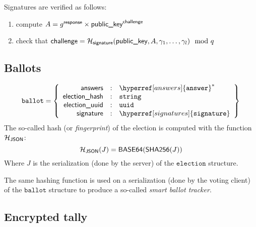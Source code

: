 \documentclass[a4paper]{article}
\newcommand{\basesixfour}{\textsf{BASE64}}
\newcommand{\shatwo}{\textsf{SHA256}}
\newcommand{\jstring}{\texttt{string}}
\newcommand{\uuid}{\texttt{uuid}}
\newcommand{\election}{\texttt{election}}
\newcommand{\ballot}{\texttt{ballot}}
\begin{document}
Signatures are verified as follows:
\begin{enumerate}
\item compute $A=g^{\textsf{response}}\times \textsf{public\_key}^{\textsf{challenge}}$
\item check that $\textsf{challenge}=\mathcal{H}_{\textsf{signature}}(\textsf{public\_key},A,\gamma_1,\dots,\gamma_l)\mod q$
\end{enumerate}

\subsection{Ballots}
\label{ballots}

\newcommand{\json}{\textsf{JSON}}

\begin{gather*}
  \ballot=\left\{
    \begin{array}{rcl}
      \answers&:&\hyperref[answers]{\answer}^\ast\\
      \textsf{election\_hash}&:&\jstring\\
      \textsf{election\_uuid}&:&\uuid\\
      \siglabel&:&\hyperref[signatures]{\signature}
    \end{array}
  \right\}
\end{gather*}
The so-called hash (or \emph{fingerprint}) of the election
is computed with the function $\Hash_\json$:
\[
\Hash_\json(J)=\basesixfour(\shatwo(J))
\]
Where $J$ is the serialization (done by the server) of the $\election$
structure.

The same hashing function is used on a serialization (done by the
voting client) of the $\ballot$ structure to produce a so-called
\emph{smart ballot tracker}.

\subsection{Encrypted tally}
\label{tally}
\end{document}
